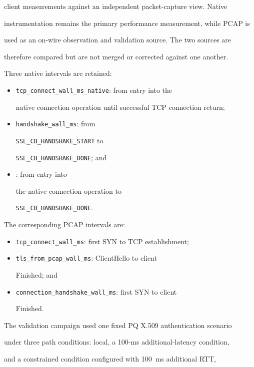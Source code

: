 \documentclass[journal]{IEEEtran}
\begin{document}
client measurements against an independent packet-capture view. Native

instrumentation remains the primary performance measurement, while PCAP is

used as an on-wire observation and validation source. The two sources are

therefore compared but are not merged or corrected against one another.



Three native intervals are retained:

\begin{itemize}
  \item \texttt{tcp\_connect\_wall\_ms\_native}: from entry into the

   native connection operation until successful TCP connection return;
  \item \texttt{handshake\_wall\_ms}: from

   \texttt{SSL\_CB\_HANDSHAKE\_START} to

   \texttt{SSL\_CB\_HANDSHAKE\_DONE}; and
  \item {}: from entry into

   the native connection operation to

   \texttt{SSL\_CB\_HANDSHAKE\_DONE}.

\end{itemize}



The corresponding PCAP intervals are:

\begin{itemize}
  \item \texttt{tcp\_connect\_wall\_ms}: first SYN to TCP establishment;
  \item \texttt{tls\_from\_pcap\_wall\_ms}: ClientHello to client

   Finished; and
  \item \texttt{connection\_handshake\_wall\_ms}: first SYN to client

   Finished.

\end{itemize}



The validation campaign used one fixed PQ X.509 authentication scenario

under three path conditions: local, a 100-ms additional-latency condition,

and a constrained condition configured with 100~ms additional RTT,
\end{document}
